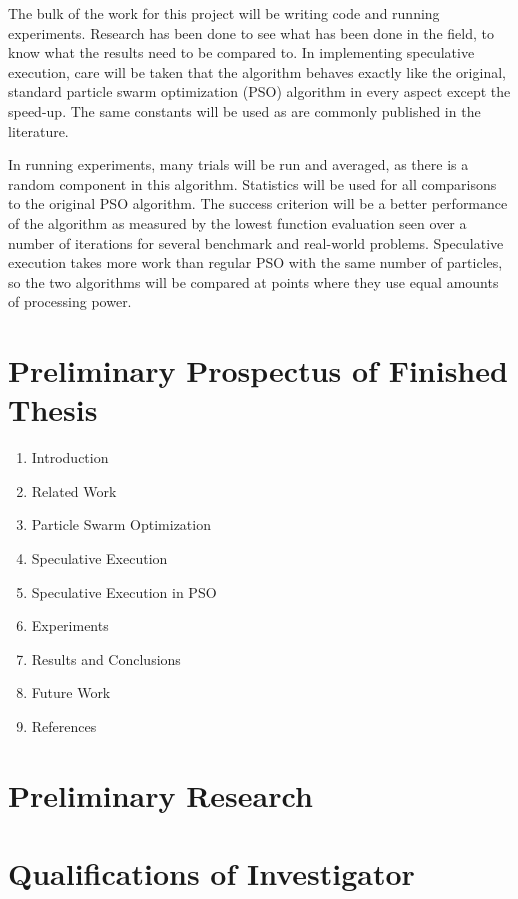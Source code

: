 \documentclass[onecolumn, 12pt]{article}
\begin{document}
The bulk of the work for this project will be writing code and running
experiments.  Research has been done to see what has been done in the field, to
know what the results need to be compared to.  In implementing speculative
execution, care will be taken that the algorithm behaves exactly like the
original, standard particle swarm optimization (PSO) algorithm in every aspect
except the speed-up.  The same constants will be used as are commonly published
in the literature.

In running experiments, many trials will be run and averaged, as there is a
random component in this algorithm.  Statistics will be used for all
comparisons to the original PSO algorithm.  The success criterion will be a
better performance of the algorithm as measured by the lowest function
evaluation seen over a number of iterations for several benchmark and
real-world problems.  Speculative execution takes more work than regular PSO
with the same number of particles, so the two algorithms will be compared at
points where they use equal amounts of processing power.

\section{Preliminary Prospectus of Finished Thesis}

\begin{enumerate}
\item Introduction
\item Related Work
\item Particle Swarm Optimization
\item Speculative Execution
\item Speculative Execution in PSO
\item Experiments
\item Results and Conclusions
\item Future Work
\item References
\end{enumerate}

\section{Preliminary Research}

\section{Qualifications of Investigator}
\end{document}

